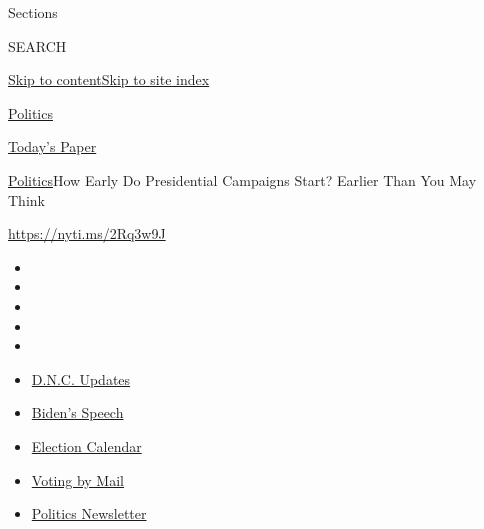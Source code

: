 Sections

SEARCH

\protect\hyperlink{site-content}{Skip to
content}\protect\hyperlink{site-index}{Skip to site index}

\href{https://www.nytimes3xbfgragh.onion/section/politics}{Politics}

\href{https://myaccount.nytimes3xbfgragh.onion/auth/login?response_type=cookie\&client_id=vi}{}

\href{https://www.nytimes3xbfgragh.onion/section/todayspaper}{Today's
Paper}

\href{/section/politics}{Politics}\textbar{}How Early Do Presidential
Campaigns Start? Earlier Than You May Think

\url{https://nyti.ms/2Rq3w9J}

\begin{itemize}
\item
\item
\item
\item
\item
\end{itemize}

\begin{itemize}
\item
  \href{https://www.nytimes3xbfgragh.onion/live/2020/08/20/us/dnc-convention-election?action=click\&pgtype=Article\&state=default\&region=TOP_BANNER\&context=storylines_menu}{D.N.C.
  Updates}
\item
  \href{https://www.nytimes3xbfgragh.onion/2020/08/20/us/politics/biden-presidential-nomination-dnc.html?action=click\&pgtype=Article\&state=default\&region=TOP_BANNER\&context=storylines_menu}{Biden's
  Speech}
\item
  \href{https://www.nytimes3xbfgragh.onion/interactive/2019/us/elections/2020-presidential-election-calendar.html?action=click\&pgtype=Article\&state=default\&region=TOP_BANNER\&context=storylines_menu}{Election
  Calendar}
\item
  \href{https://www.nytimes3xbfgragh.onion/interactive/2020/08/11/us/politics/vote-by-mail-us-states.html?action=click\&pgtype=Article\&state=default\&region=TOP_BANNER\&context=storylines_menu}{Voting
  by Mail}
\item
  \href{https://www.nytimes3xbfgragh.onion/newsletters/politics?action=click\&pgtype=Article\&state=default\&region=TOP_BANNER\&context=storylines_menu}{Politics
  Newsletter}
\end{itemize}

